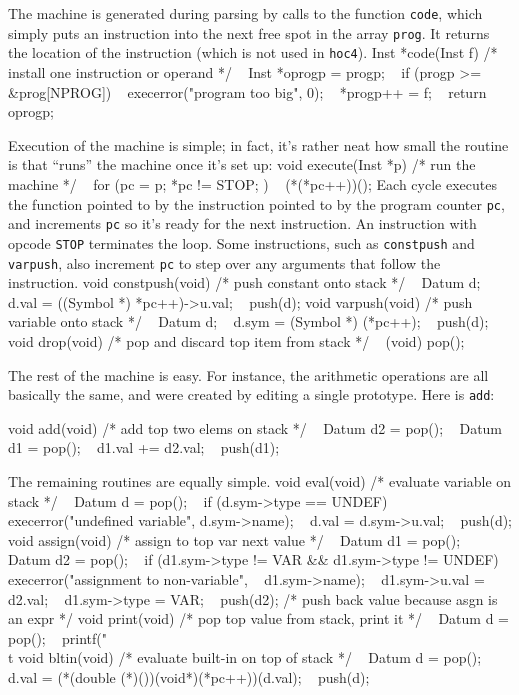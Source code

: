 {The machine is generated during parsing by calls to the function
{\tt code}, which simply puts an instruction into the next free
spot in the array {\tt prog}. It returns the location of the
instruction (which is not used in {\tt hoc4}).
\begincode
Inst *code(Inst f)  /* install one instruction or operand */
{
~       Inst *oprogp = progp;
~       if (progp >= &prog[NPROG])
~               execerror("program too big", 0);
~       *progp++ = f;
~       return oprogp;
}
\endcode

Execution of the machine is simple; in fact, it's rather neat how
small the routine is that ``runs'' the machine once it's set up:
\begincode
void execute(Inst *p)  /* run the machine */
{
~       for (pc = p; *pc != STOP; )
~               (*(*pc++))();
}
\endcode
\noindent
Each cycle executes the function pointed to by the instruction
pointed to by the program counter {\tt pc}, and increments {\tt pc}
so it's ready for the next instruction. An instruction with opcode
{\tt STOP} terminates the loop. Some instructions, such as
{\tt constpush} and {\tt varpush}, also increment {\tt pc} to step
over any arguments that follow the instruction.
\begincode
void constpush(void)  /* push constant onto stack */
{
~       Datum d;
~       d.val = ((Symbol *) *pc++)->u.val;
~       push(d);
}
\medbreak
void varpush(void)  /* push variable onto stack */
{
~       Datum d;
~       d.sym = (Symbol *) (*pc++);
~       push(d);
}
\medbreak
void drop(void)  /* pop and discard top item from stack */
{
~       (void) pop();
}
\endcode
{}

The rest of the machine is easy. For instance, the arithmetic
operations are all basically the same, and were created by
editing a single prototype. Here is {\tt add}:

\begincode
void add(void)  /* add top two elems on stack */
{
~       Datum d2 = pop();
~       Datum d1 = pop();
~       d1.val += d2.val;
~       push(d1);
}
\endcode

\noindent
The remaining routines are equally simple.
\begincode
void eval(void)  /* evaluate variable on stack */
{
~       Datum d = pop();
~       if (d.sym->type == UNDEF)
~               execerror("undefined variable", d.sym->name);
~       d.val = d.sym->u.val;
~       push(d);
}
\medbreak
void assign(void)  /* assign to top var next value */
{
~       Datum d1 = pop();
~       Datum d2 = pop();
~       if (d1.sym->type != VAR && d1.sym->type != UNDEF)
~               execerror("assignment to non-variable",
~                         d1.sym->name);
~       d1.sym->u.val = d2.val;
~       d1.sym->type = VAR;
~       push(d2);  /* push back value because asgn is an expr */
}
\medbreak
void print(void)  /* pop top value from stack, print it */
{
~       Datum d = pop();
~       printf("\\t%
}
\medbreak
void bltin(void)  /* evaluate built-in on top of stack */
{
~       Datum d = pop();
~       d.val = (*(double (*)())(void*)(*pc++))(d.val);
~       push(d);
}
\endcode

}
